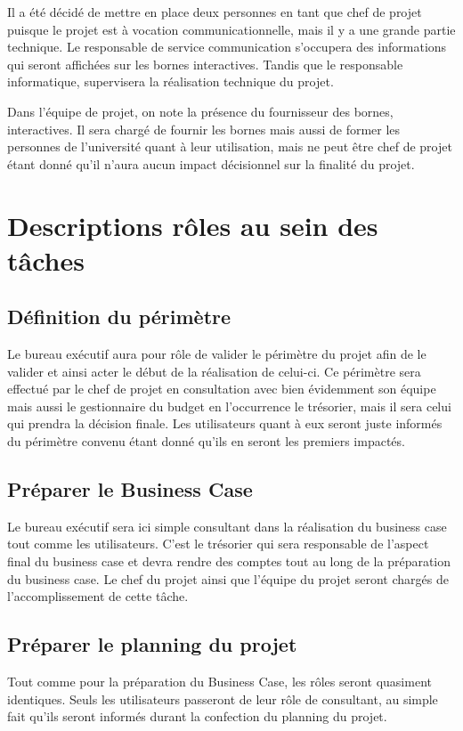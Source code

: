 Il a été décidé de mettre en place deux personnes en tant que chef de projet puisque le projet est à vocation communicationnelle, mais il y a une grande partie technique. Le responsable de service communication s’occupera des informations qui seront affichées sur les bornes interactives. Tandis que le responsable informatique, supervisera la réalisation technique du projet. 


Dans l’équipe de projet, on note la présence du fournisseur des bornes, interactives. Il sera chargé de fournir les bornes mais aussi de former les personnes de l’université quant à leur utilisation, mais ne peut être chef de projet étant donné qu’il n’aura aucun impact décisionnel sur la finalité du projet. 

\begin{table}[H]



\end{table}

\section{Descriptions rôles au sein des tâches }
    \subsection{Définition du périmètre}
    Le bureau exécutif aura pour rôle de valider le périmètre du projet afin de le valider et ainsi acter le début de la réalisation de celui-ci. Ce périmètre sera effectué par le chef de projet en consultation avec bien évidemment son équipe mais aussi le gestionnaire du budget en l’occurrence le trésorier, mais il sera celui qui prendra la décision finale. Les utilisateurs quant à eux seront juste informés du périmètre convenu étant donné qu’ils en seront les premiers impactés. 

\subsection{Préparer le Business Case }
    Le bureau exécutif sera ici simple consultant dans la réalisation du business case tout comme les utilisateurs. C’est le trésorier qui sera responsable de l’aspect final du business case et devra rendre des comptes tout au long de la préparation du business case. Le chef du projet ainsi que l’équipe du projet seront chargés de l’accomplissement de cette tâche. 

 
\subsection{Préparer le planning du projet}
    Tout comme pour la préparation du Business Case, les rôles seront quasiment identiques. Seuls les utilisateurs passeront de leur rôle de consultant, au simple fait qu’ils seront informés durant la confection du planning du projet. 

